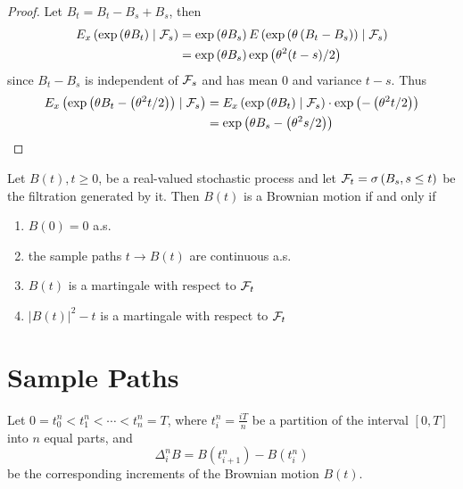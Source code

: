 \begin{proof}
	Let $B_{t}=B_{t}-B_{s}+B_{s}$, then
	\begin{equation*}
		\begin{aligned}
			E_{x}\left(\exp\left(\theta B_{t}\right)\mid{\mathcal F}_{s}\right) & =\exp \left(\theta B_{s}\right)E\left(\exp\left(\theta\left(B_{t}-B_{s}\right)\right)\mid{\mathcal F}_{s}\right) \\
			                                                            & =\exp\left(\theta B_{s}\right)\exp\left(\theta^{2}(t-s)/2\right)
		\end{aligned}
	\end{equation*}
	since $B_{t}-B_{s}$ is independent of ${\mathcal F}_{s}$ and has mean 0 and variance $t-s$. Thus
	\begin{equation*}
		\begin{aligned}
			E_{x}\left(\exp\left(\theta B_{t}-\left(\theta^{2}t/2\right)\right)\mid{\mathcal F}_{s}\right) & =E_{x}\left(\exp\left(\theta B_{t}\right)\mid{\mathcal F}_{s}\right)\cdot\exp\left(-\left(\theta^{2}t/2\right)\right) \\
			                                                                                       & =\exp\left(\theta B_{s}-\left(\theta^{2}s/2\right)\right)
		\end{aligned}
	\end{equation*}
\end{proof}

\begin{theorem}
	Let $B(t),t\geq 0$, be a real-valued stochastic process and let ${\mathcal F}_{t}=\sigma\left(B_{s},s\leq t\right)$ be the filtration generated by it. Then $B(t)$ is a Brownian motion if and only if
	\begin{enumerate}
		\item $B(0)=0$ a.s.
		\item the sample paths $t\rightarrow B(t)$ are continuous a.s.
		\item $B(t)$ is a martingale with respect to ${\mathcal F}_{t}$
		\item $|B(t)|^{2}-t$ is a martingale with respect to ${\mathcal F}_{t}$
	\end{enumerate}
\end{theorem}

\section{Sample Paths}

Let $0=t_{0}^{n}<t_{1}^{n}<\cdots<t_{n}^{n}=T$, where $t_{i}^{n}=\frac{iT}{n}$ be a partition of the interval $[0,T]$ into $n$ equal parts, and
\begin{equation}
	\Delta_{i}^{n}B=B\left(t_{i+1}^{n}\right)-B\left(t_{i}^{n}\right)
\end{equation}
be the corresponding increments of the Brownian motion $B(t)$.

